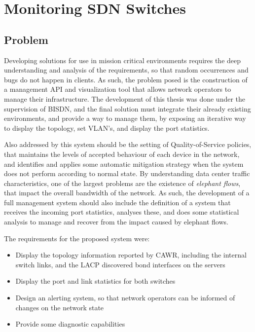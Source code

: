 \chapter{Monitoring SDN Switches} \label{chap:mon_sdn} %

\section {Problem}

Developing solutions for use in mission critical environments requires the deep understanding and analysis of the requirements, so that random occurrences
and bugs do not happen in clients. As such, the problem posed is the construction of a management API and visualization tool that allows network operators to manage 
their infrastructure. The development of this thesis was done under the supervision of BISDN, and the final solution must integrate their already existing 
environments, and provide a way to manage them, by exposing an iterative way to display the topology, set VLAN's, and display the port statistics. 

\par Also addressed by this system should be the setting of Quality-of-Service policies, that maintains the levels of accepted behaviour of each device in the 
network, and identifies and applies some automatic mitigation strategy when the system does not perform according to normal state. By understanding data center 
traffic characteristics, one of the largest problems are the existence of \textit{elephant flows}, that impact the overall bandwidth of the network. As such, 
the development of a full management system should also include the definition of a system that receives the incoming port statistics, analyses these, and does some 
statistical analysis to manage and recover from the impact caused by elephant flows.

The requirements for the proposed system were:

\begin {itemize}
    \item Display the topology information reported by CAWR, including the internal switch links, and the LACP discovered bond interfaces on the servers
    \item Display the port and link statistics for both switches
    \item Design an alerting system, so that network operators can be informed of changes on the network state
    \item Provide some diagnostic capabilities
\end {itemize}

